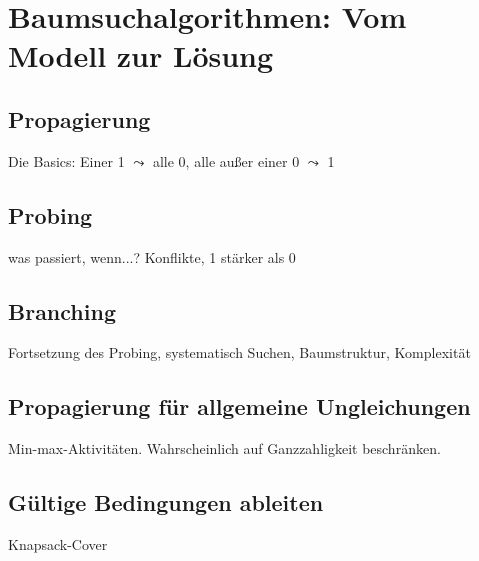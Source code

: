 \chapter{Baumsuchalgorithmen: Vom Modell zur Lösung}
\label{chap_technik}

\section{Propagierung}
Die Basics: Einer 1 $\leadsto$ alle 0, alle außer einer 0 $\leadsto$ 1

\section{Probing}
was passiert, wenn...? Konflikte, 1 stärker als 0

\section{Branching}
Fortsetzung des Probing, systematisch Suchen, Baumstruktur,
Komplexität

\section{Propagierung für allgemeine Ungleichungen}
Min-max-Aktivitäten. Wahrscheinlich auf Ganzzahligkeit beschränken.

\section{Gültige Bedingungen ableiten}
Knapsack-Cover
